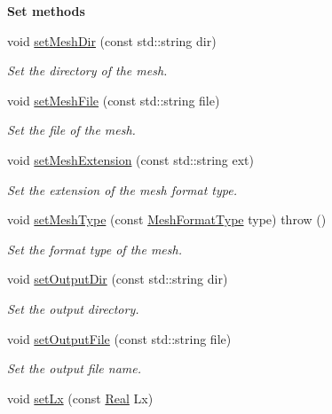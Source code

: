 \begin{Indent}{\bf Set methods}\par
\begin{DoxyCompactItemize}
\item 
void \hyperlink{classFVCode3D_1_1Data_a9d1e654e780ff8196720b947689dd9f8}{set\+Mesh\+Dir} (const std\+::string dir)
\begin{DoxyCompactList}\small\item\em Set the directory of the mesh. \end{DoxyCompactList}\item 
void \hyperlink{classFVCode3D_1_1Data_a78ef784e9755b8e1285d597eddb9d1de}{set\+Mesh\+File} (const std\+::string file)
\begin{DoxyCompactList}\small\item\em Set the file of the mesh. \end{DoxyCompactList}\item 
void \hyperlink{classFVCode3D_1_1Data_a1f2a77ec9eb6e10ae5f5e7150343bc81}{set\+Mesh\+Extension} (const std\+::string ext)
\begin{DoxyCompactList}\small\item\em Set the extension of the mesh format type. \end{DoxyCompactList}\item 
void \hyperlink{classFVCode3D_1_1Data_aa99fa6c201237aeda46ad434c71caadc}{set\+Mesh\+Type} (const \hyperlink{classFVCode3D_1_1Data_a6a9aa6abc2ca3c85be8578d82a61a9c6}{Mesh\+Format\+Type} type)  throw ()
\begin{DoxyCompactList}\small\item\em Set the format type of the mesh. \end{DoxyCompactList}\item 
void \hyperlink{classFVCode3D_1_1Data_a5dd692c7bb0d0cc1ea440845c637d778}{set\+Output\+Dir} (const std\+::string dir)
\begin{DoxyCompactList}\small\item\em Set the output directory. \end{DoxyCompactList}\item 
void \hyperlink{classFVCode3D_1_1Data_a3da09b88d987571c7be1fdad165d5195}{set\+Output\+File} (const std\+::string file)
\begin{DoxyCompactList}\small\item\em Set the output file name. \end{DoxyCompactList}\item 
void \hyperlink{classFVCode3D_1_1Data_a407ef57c3db6434524e47d6c88ad8048}{set\+Lx} (const \hyperlink{namespaceFVCode3D_a40c1f5588a248569d80aa5f867080e83}{Real} Lx)

\end{DoxyCompactItemize}
\end{Indent}
